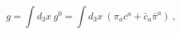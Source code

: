 \begin{equation}
g = \int d_{3} x ~g^{0} = \int d_{3} x~ (\pi_{a} c^{a} +
\bar{c}_{a} \bar{\pi}^{a})~,   
\end{equation}

